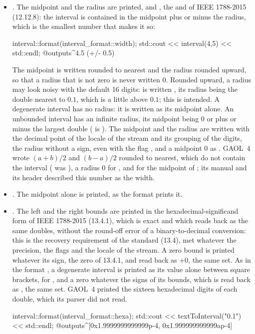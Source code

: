 \begin{itemize}
\item[$\bullet$] . The midpoint and the radius are printed,
 and , the  and  of IEEE
1788-2015 (12.12.8): the
interval is contained in the midpoint plus or minus the radius, which is
the smallest number that makes it so:
\begin{example}
interval::format(interval_format::width);
std::cout << interval(4,5) << std::endl;
@outputs^4.5 (+/- 0.5)~
\end{example}
The midpoint is written rounded to nearest and the radius rounded upward,
so that a radius that is not zero is never written 0. Rounded upward, a
radius may look noisy with the default 16 digits:  is written
, its radius being the double nearest to
$0.1$, which is a little above $0.1$; this is intended. A degenerate
interval has no radius: it is written as its midpoint alone. An unbounded
interval has an infinite radius, its midpoint being $0$ or plus or minus
the largest double (\code{[3, inf]} is
). The midpoint and the radius are
written with the decimal point of the locale of the stream and its grouping
of the digits, the radius without a sign, even with the flag
, and a midpoint $0$ as .\newinvfive{} GAOL~4 wrote
$(a+b)/2$ and $(b-a)/2$ rounded to nearest, which do not contain the
interval ( was ), a radius 0 for
, and  for the midpoint of
; its manual and its header described this
number as the width.

\item[$\bullet$] . The midpoint alone is printed, as the
format  prints it.\newinvfive

\item[$\bullet$] . The left and the right bounds are printed
in the hexadecimal-significand form of IEEE 1788-2015 (13.4.1), which is
exact and which  reads back as the same doubles,
without the round-off error of a binary-to-decimal conversion: this is the
recovery requirement of the standard (13.4), met whatever the precision,
the flags and the locale of the stream. A zero bound is printed
 whatever its sign, the zero of 13.4.1, and read back as
$+0$, the same set.\newinvfive{} As in the format ,
a degenerate interval is printed as its value alone between square
brackets, \code{[0x1.8p+0]} for , and a zero
\code{[0x0p+0]} whatever the signs of its bounds, which is read back as
, the same set. GAOL~4 printed the sixteen hexadecimal digits
of each double, which its parser did not read.\newinvfive
{}%
\begin{example}
interval::format(interval_format::hexa);
std::cout << textToInterval("0.1") << std::endl;
@outputs^[0x1.9999999999999p-4, 0x1.999999999999ap-4]~
\end{example}
\end{itemize}

